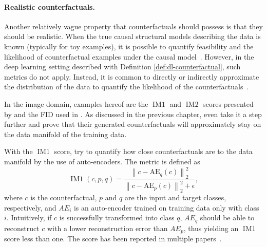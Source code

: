 \documentclass[11pt,a4paper,twoside,openright,final]{memoir}
\begin{document}
\paragraph{Realistic counterfactuals.} 
Another relatively vague property that counterfactuals should possess is that they should be realistic.
When the true causal structural models describing the data is known (typically for toy examples), it is possible to quantify feasibility and the likelihood of counterfactual examples under the causal model~\cite{Mahajan2019}. 
However, in the deep learning setting described with Definition \ref{def:dl-counterfactual}, such metrics do not apply. 
Instead, it is common to directly or indirectly approximate the distribution of the data to quantify the likelihood of the counterfactuals~\cite{VanLooveren2019, flowcounterfactuals, Singla2019, Rodriguez2021}.

In the image domain, examples hereof are the $\operatorname{IM1}$ and $\operatorname{IM2}$ scores presented by \citet{VanLooveren2019} and the FID used in \cite{Singla2019, Rodriguez2021}. 
As discussed in the previous chapter, \citet{flowcounterfactuals} even take it a step further and prove that their generated counterfactuals will approximately stay on the data manifold of the training data.

With the $\operatorname{IM1}$ score, \citet{VanLooveren2019} try to quantify how close counterfactuals are to the data manifold by the use of auto-encoders.
The metric is defined as 
\begin{equation} 
    \label{eq:IM1} 
  \operatorname{IM1}\left( c, p, q \right) = 
        \frac{
            \left\|c-\mathrm{AE}_{q}(c)\right\|_{2}^{2}}
        {
            \left\|c-\mathrm{AE}_{p}(c)\right\|_{2}^{2}+\epsilon
        },
\end{equation}
where $c$ is the counterfactual, $p$ and $q$ are the input and target classes, respectively, and $AE_i$ is an auto-encoder trained on training data only with class $i$. 
Intuitively, if $c$ is successfully transformed into class $q$, $AE_q$ should be able to reconstruct $c$ with a lower reconstruction error than $AE_p$, thus yielding an $\operatorname{IM1}$ score less than one.
The score has been reported in multiple papers~\cite{VanLooveren2019, Mahajan2019, Schut2021}. 
\end{document}

